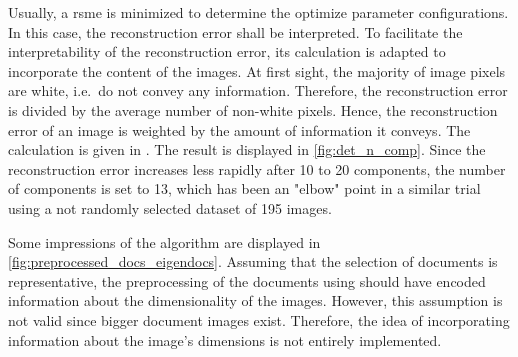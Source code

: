 Usually, a \ac{rsme} is minimized to determine the optimize parameter configurations.
In this case, the reconstruction error shall be interpreted.
To facilitate the interpretability of the reconstruction error, its calculation is adapted to incorporate the content of the images.
At first sight, the majority of image pixels are white, i.e.\ do not convey any information.
Therefore, the reconstruction error is divided by the average number of non-white pixels. 
Hence, the reconstruction error of an image is weighted by the amount of information it conveys.
The calculation is given in .
The result is displayed in \autoref{fig:det_n_comp}.
Since the reconstruction error increases less rapidly after 10 to 20 components, the number of components is set to 13,
which has been an "elbow" point in a similar trial using a not randomly selected dataset of 195 images.


Some impressions of the \eigendocs{} algorithm are displayed in \autoref{fig:preprocessed_docs_eigendocs}.
Assuming that the selection of documents is representative, 
the preprocessing of the documents using \eigendocs{} should have encoded information about the dimensionality of the images.
However, this assumption is not valid since bigger document images exist.
Therefore, the idea of incorporating information about the image's dimensions is not entirely implemented.